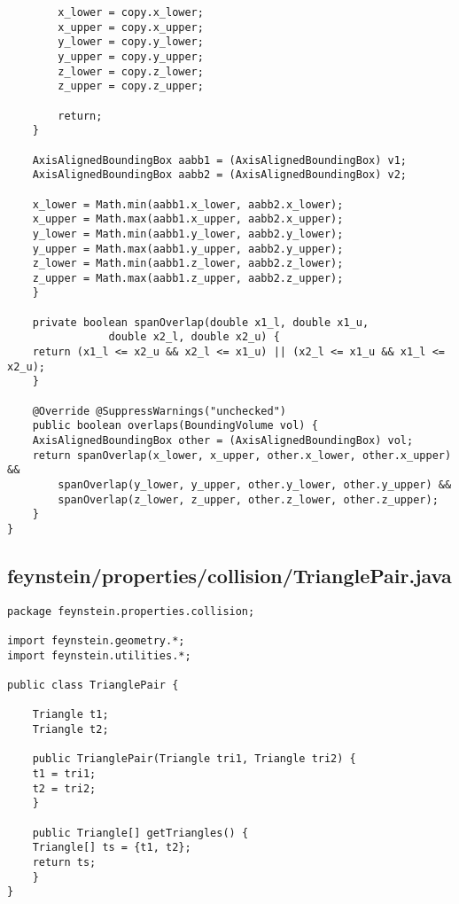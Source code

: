 \begin{lstlisting}
	    x_lower = copy.x_lower;
	    x_upper = copy.x_upper;
	    y_lower = copy.y_lower;
	    y_upper = copy.y_upper;
	    z_lower = copy.z_lower;
	    z_upper = copy.z_upper;

	    return;
	}

	AxisAlignedBoundingBox aabb1 = (AxisAlignedBoundingBox) v1;
	AxisAlignedBoundingBox aabb2 = (AxisAlignedBoundingBox) v2;

	x_lower = Math.min(aabb1.x_lower, aabb2.x_lower);
	x_upper = Math.max(aabb1.x_upper, aabb2.x_upper);
	y_lower = Math.min(aabb1.y_lower, aabb2.y_lower);
	y_upper = Math.max(aabb1.y_upper, aabb2.y_upper);
	z_lower = Math.min(aabb1.z_lower, aabb2.z_lower);
	z_upper = Math.max(aabb1.z_upper, aabb2.z_upper);
    }

    private boolean spanOverlap(double x1_l, double x1_u, 
				double x2_l, double x2_u) {
	return (x1_l <= x2_u && x2_l <= x1_u) || (x2_l <= x1_u && x1_l <= x2_u);
    }

    @Override @SuppressWarnings("unchecked")	
    public boolean overlaps(BoundingVolume vol) {
	AxisAlignedBoundingBox other = (AxisAlignedBoundingBox) vol;
	return spanOverlap(x_lower, x_upper, other.x_lower, other.x_upper) &&
	    spanOverlap(y_lower, y_upper, other.y_lower, other.y_upper) &&
	    spanOverlap(z_lower, z_upper, other.z_lower, other.z_upper);
    }	    
}\end{lstlisting}

\subsection*{feynstein/properties/collision/TrianglePair.java}
\begin{lstlisting}
package feynstein.properties.collision;

import feynstein.geometry.*;
import feynstein.utilities.*;

public class TrianglePair {

    Triangle t1;
    Triangle t2;

    public TrianglePair(Triangle tri1, Triangle tri2) {
	t1 = tri1;
	t2 = tri2;
    }

    public Triangle[] getTriangles() {
	Triangle[] ts = {t1, t2};
	return ts;
    }
}\end{lstlisting}

